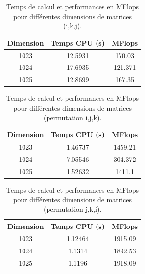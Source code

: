 \documentclass[a4paper,13pt]{book}
\begin{document}
\begin{table}[h!]
    \begin{center}
    \begin{tabular}{|c|c|c|}
        \hline
        Dimension & Temps CPU (s) & MFlops \\ \hline
        1023      & 12.5931       & 170.03 \\ \hline
        1024      & 17.6935       & 121.371 \\ \hline
        1025      & 12.8699       & 167.35 \\ \hline
    \end{tabular}
    \caption{Temps de calcul et performances en MFlops pour différentes dimensions de matrices (i,k,j).}
    \label{tab:perf_matrix_i,k_j}
\end{center}
\end{table}

\begin{table}[h!]
    \begin{center}
    \begin{tabular}{|c|c|c|}
        \hline
        Dimension & Temps CPU (s) & MFlops \\ \hline
        1023      & 1.46737       & 1459.21 \\ \hline
        1024      & 7.05546       & 304.372 \\ \hline
        1025      & 1.52632       & 1411.1  \\ \hline
    \end{tabular}
    \caption{Temps de calcul et performances en MFlops pour différentes dimensions de matrices (permutation i,j,k).}
    \label{tab:perf_matrix_i,j,k}
\end{center}
\end{table}

\begin{table}[h!]
    \begin{center}
    \begin{tabular}{|c|c|c|}
        \hline
        Dimension & Temps CPU (s) & MFlops \\ \hline
        1023      & 1.12464       & 1915.09 \\ \hline
        1024      & 1.1314       & 1892.53 \\ \hline
        1025      & 1.1196       & 1918.09 \\ \hline
    \end{tabular}
    \caption{Temps de calcul et performances en MFlops pour différentes dimensions de matrices (permutation j,k,i).}
    \label{tab:perf_matrix_first_j,k,i}
\end{center}
\end{table}
\end{document}

